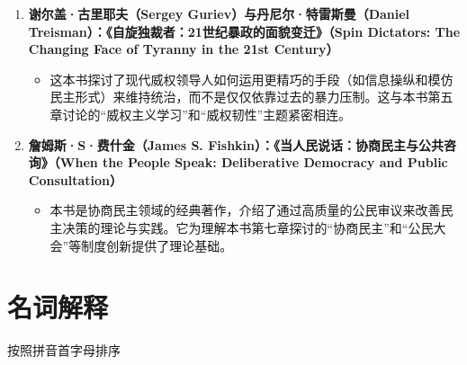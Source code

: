 \documentclass[UTF8, 10pt]{ctexbook}
\begin{document}
\begin{enumerate}
    \item  \textbf{谢尔盖·古里耶夫（Sergey Guriev）与丹尼尔·特雷斯曼（Daniel Treisman）：《自旋独裁者：21世纪暴政的面貌变迁》（Spin Dictators: The Changing Face of Tyranny in the 21st Century）}
    \begin{itemize}
        \item   这本书探讨了现代威权领导人如何运用更精巧的手段（如信息操纵和模仿民主形式）来维持统治，而不是仅仅依靠过去的暴力压制。这与本书第五章讨论的“威权主义学习”和“威权韧性”主题紧密相连。
    \end{itemize}

    \item  \textbf{詹姆斯·S·费什金（James S. Fishkin）：《当人民说话：协商民主与公共咨询》（When the People Speak: Deliberative Democracy and Public Consultation）}
    \begin{itemize}
        \item   本书是协商民主领域的经典著作，介绍了通过高质量的公民审议来改善民主决策的理论与实践。它为理解本书第七章探讨的“协商民主”和“公民大会”等制度创新提供了理论基础。
    \end{itemize}
\end{enumerate}

\chapter{名词解释}
\lettrine[lines=2]{按}{照}拼音首字母排序
\end{document}
